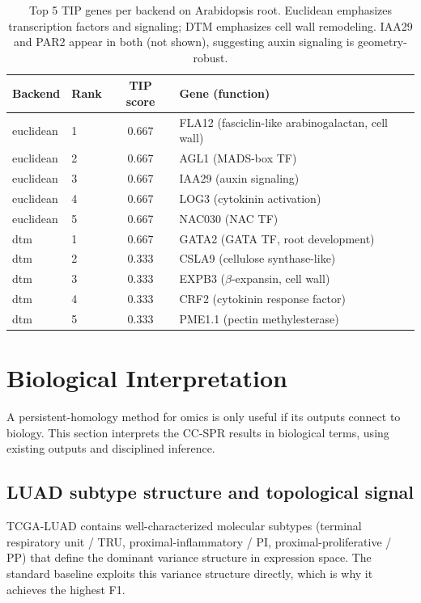 \documentclass[11pt]{article}
\begin{document}
\begin{table}[h]
\centering\small
\begin{tabular}{llcl}
\toprule
Backend & Rank & TIP score & Gene (function) \\
\midrule
euclidean & 1 & 0.667 & FLA12 (fasciclin-like arabinogalactan, cell wall) \\
euclidean & 2 & 0.667 & AGL1 (MADS-box TF) \\
euclidean & 3 & 0.667 & IAA29 (auxin signaling) \\
euclidean & 4 & 0.667 & LOG3 (cytokinin activation) \\
euclidean & 5 & 0.667 & NAC030 (NAC TF) \\
\midrule
dtm & 1 & 0.667 & GATA2 (GATA TF, root development) \\
dtm & 2 & 0.333 & CSLA9 (cellulose synthase-like) \\
dtm & 3 & 0.333 & EXPB3 ($\beta$-expansin, cell wall) \\
dtm & 4 & 0.333 & CRF2 (cytokinin response factor) \\
dtm & 5 & 0.333 & PME1.1 (pectin methylesterase) \\
\bottomrule
\end{tabular}
\caption{Top 5 TIP genes per backend on Arabidopsis root. Euclidean emphasizes transcription factors and signaling; DTM emphasizes cell wall remodeling. IAA29 and PAR2 appear in both (not shown), suggesting auxin signaling is geometry-robust.}
\label{tab:arab_genes}
\end{table}

\section{Biological Interpretation}
\label{sec:biology}

A persistent-homology method for omics is only useful if its outputs connect to biology.
This section interprets the CC-SPR results in biological terms, using existing outputs and disciplined inference.

\subsection{LUAD subtype structure and topological signal}

TCGA-LUAD contains well-characterized molecular subtypes (terminal respiratory unit / TRU, proximal-inflammatory / PI, proximal-proliferative / PP) that define the dominant variance structure in expression space.
The standard baseline exploits this variance structure directly, which is why it achieves the highest F1.
\end{document}
